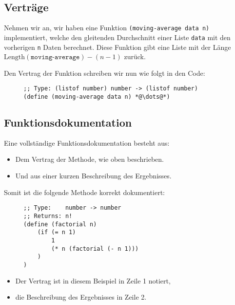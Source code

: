 
\subsection{Verträge}
	
	Nehmen wir an, wir haben eine Funktion \texttt{(moving-average data n)} implementiert, welche den gleitenden Durchschnitt einer Liste \texttt{data} mit den vorherigen \texttt{n} Daten berechnet. Diese Funktion gibt eine Liste mit der Länge \( \text{Length}(\texttt{moving-average}) - (n - 1) \) zurück.
	
	Den Vertrag der Funktion schreiben wir nun wie folgt in den Code:
	\begin{figure}[H]
		\centering
		\begin{lstlisting}[language = Racket]
;; Type: (listof number) number -> (listof number)
(define (moving-average data n) *@\dots@*)
\end{lstlisting}
	\end{figure}

\subsection{Funktionsdokumentation}
	Eine vollständige Funktionsdokumentation besteht aus:
	\begin{itemize}
		\item Dem Vertrag der Methode, wie oben beschrieben.
		\item Und aus einer kurzen Beschreibung des Ergebnisses.
	\end{itemize}

	Somit ist die folgende Methode korrekt dokumentiert:
	\begin{figure}[H]
		\centering
		\begin{lstlisting}[language = Racket]
;; Type:    number -> number
;; Returns: n!
(define (factorial n)
	(if (= n 1)
		1
		(* n (factorial (- n 1)))
	)
)
\end{lstlisting}
	\end{figure}
	\begin{itemize}
		\item Der Vertrag ist in diesem Beispiel in Zeile 1 notiert,
		\item die Beschreibung des Ergebnisses in Zeile 2.
	\end{itemize}
